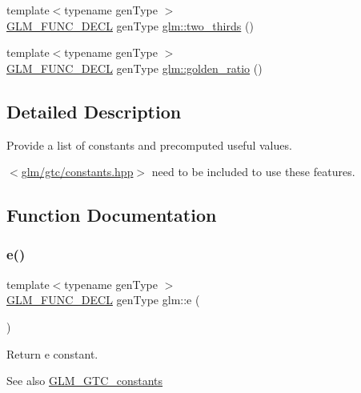 \begin{DoxyCompactItemize}
\item 
{\footnotesize template$<$typename gen\+Type $>$ }\\\hyperlink{setup_8hpp_ab2d052de21a70539923e9bcbf6e83a51}{G\+L\+M\+\_\+\+F\+U\+N\+C\+\_\+\+D\+E\+CL} gen\+Type \hyperlink{group__gtc__constants_gadde7f2efce3b14c8b26944fbafed4a10}{glm\+::two\+\_\+thirds} ()
\item 
{\footnotesize template$<$typename gen\+Type $>$ }\\\hyperlink{setup_8hpp_ab2d052de21a70539923e9bcbf6e83a51}{G\+L\+M\+\_\+\+F\+U\+N\+C\+\_\+\+D\+E\+CL} gen\+Type \hyperlink{group__gtc__constants_gafd53093ef2d756333865d774bea3cdf9}{glm\+::golden\+\_\+ratio} ()
\end{DoxyCompactItemize}


\subsection{Detailed Description}
Provide a list of constants and precomputed useful values. 

$<$\hyperlink{gtc_2constants_8hpp}{glm/gtc/constants.\+hpp}$>$ need to be included to use these features. 

\subsection{Function Documentation}
\mbox{\label{group__gtc__constants_gab83fb6de0f05d6c0d11bdf0479f8319e}} 
\subsubsection{\texorpdfstring{e()}{e()}}
{\footnotesize\ttfamily template$<$typename gen\+Type $>$ \\
\hyperlink{setup_8hpp_ab2d052de21a70539923e9bcbf6e83a51}{G\+L\+M\+\_\+\+F\+U\+N\+C\+\_\+\+D\+E\+CL} gen\+Type glm\+::e (\begin{DoxyParamCaption}{ }\end{DoxyParamCaption})}

Return e constant. \begin{DoxySeeAlso}{See also}
\hyperlink{group__gtc__constants}{G\+L\+M\+\_\+\+G\+T\+C\+\_\+constants} 
\end{DoxySeeAlso}


